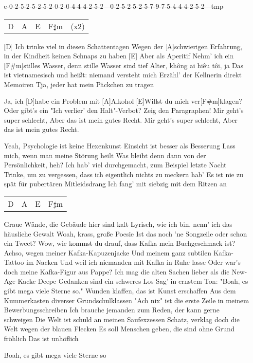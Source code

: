 

\begin{guitar}
	e-0-2-5-2-5-2-5-2-0-2-0-4-4-4-2-5-2---0-2-5-2-5-2-5-7-9-7-5-4-4-4-2-5-2---{\color{gray}tmp}
	{\footnotesize\begin{tabular}{l|l|l|ll}
			D & A & E & F$\sharp$m & (x2)
	\end{tabular}}
	
	[D] Ich trinke viel in diesen Schattentagen
	Wegen der [A]schwierigen Erfahrung, in der Kindheit keinen Schnaps zu haben
	[E] Aber als Aperitif
	Nehm' ich ein [F#m]stilles Wasser, denn stille Wasser sind tief
	Alter, không ai hiêu tôi, ja
	Das ist vietnamesisch und heißt: niemand versteht mich
	Erzähl' der Kellnerin direkt Memoiren
	Tja, jeder hat mein Päckchen zu tragen
	
	Ja, ich [D]habe ein Problem mit [A]Alkohol
	[E]Willst du mich ver[F#m]klagen?
	Oder gibt's ein "Ich verlier' den Halt"-Verbot?
	Zeig den Paragraphen!
	Mir geht's super schlecht,
	Aber das ist mein gutes Recht.
	Mir geht's super schlecht,
	Aber das ist mein gutes Recht.
	
	Yeah, Psychologie ist keine Hexenkunst
	Einsicht ist besser als Besserung
	Lass mich, wenn man meine Störung heilt
	Was bleibt denn dann von der Persönlichkeit, heh?
	Ich hab' viel durchgemacht, zum Beispiel letzte Nacht
	Trinke, um zu vergessen, dass ich eigentlich nichts zu meckern hab'
	Es ist nie zu spät für pubertären Mitleidsdrang
	Ich fang' mit siebzig mit dem Ritzen an
	
	 
	
	{\footnotesize\begin{tabular}{l|l|l|l}
			D & A & E & F$\sharp$m
	\end{tabular}}
	
	Graue Wände, die Gebäude hier sind kalt
	Lyrisch, wie ich bin, nenn' ich das häusliche Gewalt
	Woah, krass, große Poesie
	Ist das noch 'ne Songzeile oder schon ein Tweet?
	Wow, wie kommst du drauf, dass Kafka mein Buchgeschmack ist?
	Achso, wegen meiner Kafka-Kapuzenjacke
	Und meinem ganz subtilen Kafka-Tattoo im Nacken
	Und weil ich niemanden mit Kafka in Ruhe lasse
	Oder war's doch meine Kafka-Figur aus Pappe?
	Ich mag die alten Sachen lieber als die New-Age-Kacke
	Deepe Gedanken sind ein schweres Los
	Sag' in ernstem Ton: "Boah, es gibt mega viele Sterne so."
	Wunden klaffen, das ist Kunst erschaffen
	Aus dem Kummerkasten diverser Grundschulklassen
	"Ach nix" ist die erste Zeile in meinem Bewerbungsschreiben
	Ich brauche jemanden zum Reden, der kann gerne schweigen
	Die Welt ist schuld an meinen Saufexzessen
	Schatz, verklag doch die Welt wegen der blauen Flecken
	Es soll Menschen geben, die sind ohne Grund fröhlich
	Das ist unhöflich
	
	 
	
	Boah, es gibt mega viele Sterne so
\end{guitar}